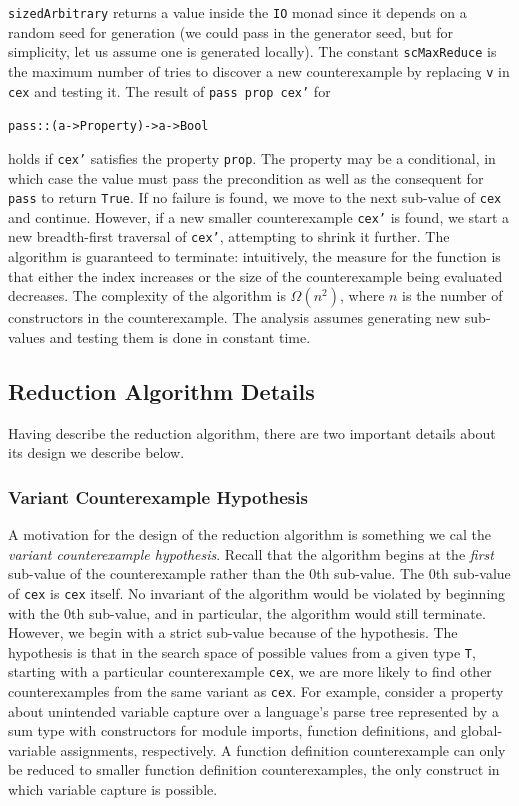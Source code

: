 \documentclass[10pt]{sigplanconf}
\newenvironment{code}{\begin{alltt}\small}{\end{alltt}}
\newcommand{\ttp}[1]{\texttt{#1}}
\begin{document}
\ttp{sizedArbitrary} returns a value inside the \ttp{IO} monad since it depends
on a random seed for generation (we could pass in the generator seed, but for
simplicity, let us assume one is generated locally).  The constant
\ttp{scMaxReduce} is the maximum number of tries to discover a new
counterexample by replacing \ttp{v} in \ttp{cex} and testing it.  The result of
\ttp{pass prop cex'} for
%
\begin{code}
pass :: (a -> Property) -> a -> Bool
\end{code}
%
\noindent
holds if \ttp{cex'} satisfies the property \ttp{prop}.  The property may be a
conditional, in which case the value must pass the precondition as well as the
consequent for \ttp{pass} to return \ttp{True}.  If no failure is found, we move
to the next sub-value of \ttp{cex} and continue.  However, if a new smaller
counterexample \ttp{cex'} is found, we start a new breadth-first traversal of
\ttp{cex'}, attempting to shrink it further.  The algorithm is guaranteed to
terminate: intuitively, the measure for the function is that either the index
increases or the size of the counterexample being evaluated decreases.  The
complexity of the algorithm is $\Omega(n^2)$, where $n$ is the number of
constructors in the counterexample.  The analysis assumes generating new
sub-values and testing them is done in constant time.

\subsection{Reduction Algorithm Details}
Having describe the reduction algorithm, there are two important details about
its design we describe below.

\subsubsection{Variant Counterexample Hypothesis}
A motivation for the design of the reduction algorithm is something we cal the
\emph{variant counterexample hypothesis}.  Recall that the algorithm begins at
the \emph{first} sub-value of the counterexample rather than the 0th sub-value.
The 0th sub-value of \ttp{cex} is \ttp{cex} itself.  No invariant of the
algorithm would be violated by beginning with the 0th sub-value, and in
particular, the algorithm would still terminate.  However, we begin with a
strict sub-value because of the hypothesis.  The hypothesis is that in the
search space of possible values from a given type \ttp{T}, starting with a
particular counterexample \ttp{cex}, we are more likely to find other
counterexamples from the same variant as \ttp{cex}.  For example, consider a
property about unintended variable capture over a language's parse tree
represented by a sum type with constructors for module imports, function
definitions, and global-variable assignments, respectively.  A function
definition counterexample can only be reduced to smaller function definition
counterexamples, the only construct in which variable capture is possible.
\end{document}
